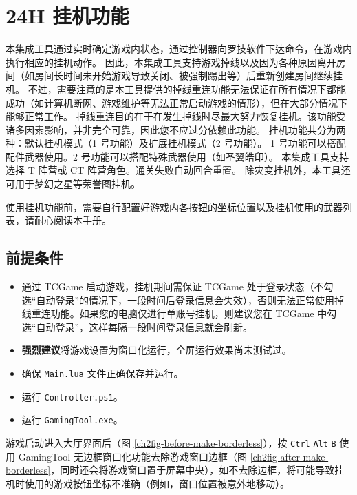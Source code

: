 \section{24H 挂机功能}

本集成工具通过实时确定游戏内状态，通过控制器向罗技软件下达命令，在游戏内执行相应的挂机动作。
因此，本集成工具支持游戏掉线以及因为各种原因离开房间（如房间长时间未开始游戏导致关闭、被强制踢出等）后重新创建房间继续挂机。
不过，需要注意的是本工具提供的掉线重连功能无法保证在所有情况下都能成功（如计算机断网、游戏维护等无法正常启动游戏的情形），但在大部分情况下能够正常工作。
掉线重连目的在于在发生掉线时尽最大努力恢复挂机。该功能受诸多因素影响，并非完全可靠，因此您不应过分依赖此功能。
挂机功能共分为两种：默认挂机模式（1 号功能）及扩展挂机模式（2 号功能）。
1 号功能可以搭配配件武器使用。2 号功能可以搭配特殊武器使用（如圣翼皓印）。
本集成工具支持选择 T 阵营或 CT 阵营角色。通关失败自动回合重置。
除灾变挂机外，本工具还可用于梦幻之星等荣誉图挂机。

使用挂机功能前，需要自行配置好游戏内各按钮的坐标位置以及挂机使用的武器列表，请耐心阅读本手册。

\subsection{前提条件}

\begin{itemize}

\item 通过 TCGame 启动游戏，挂机期间需保证 TCGame 处于登录状态（不勾选“自动登录”的情况下，一段时间后登录信息会失效），否则无法正常使用掉线重连功能。如果您的电脑仅进行单账号挂机，则建议您在 TCGame 中勾选“自动登录”，这样每隔一段时间登录信息就会刷新。

\item \textbf{\color{red}强烈建议}将游戏设置为窗口化运行，全屏运行效果尚未测试过。

\item 确保 \lstinline{Main.lua} 文件正确保存并运行。

\item 运行 \lstinline{Controller.ps1}。

\item 运行 \lstinline{GamingTool.exe}。

\end{itemize}

游戏启动进入大厅界面后（图 \ref{ch2fig-before-make-borderless}），按 \lstinline{Ctrl} \lstinline{Alt} \lstinline{B} 使用 GamingTool 无边框窗口化功能去除游戏窗口边框（图 \ref{ch2fig-after-make-borderless}，同时还会将游戏窗口置于屏幕中央），如不去除边框，将可能导致挂机时使用的游戏按钮坐标不准确（例如，窗口位置被意外地移动）。

